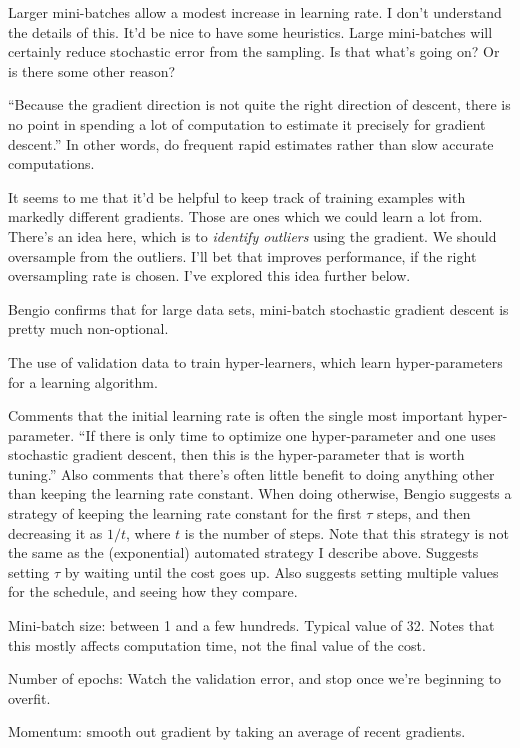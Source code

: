 \documentclass[12pt]{report}
\begin{document}
Larger mini-batches allow a modest increase in learning rate.  I don't
understand the details of this.  It'd be nice to have some heuristics.
Large mini-batches will certainly reduce stochastic error from the
sampling.  Is that what's going on?  Or is there some other reason?

``Because the gradient direction is not quite the right direction of
descent, there is no point in spending a lot of computation to
estimate it precisely for gradient descent.''  In other words, do
frequent rapid estimates rather than slow accurate computations.

It seems to me that it'd be helpful to keep track of training examples
with markedly different gradients.  Those are ones which we could
learn a lot from.  There's an idea here, which is to \emph{identify
  outliers} using the gradient.  We should oversample from the
outliers.  I'll bet that improves performance, if the right
oversampling rate is chosen.  I've explored this idea further below.

Bengio confirms that for large data sets, mini-batch stochastic
gradient descent is pretty much non-optional.

The use of validation data to train hyper-learners, which learn
hyper-parameters for a learning algorithm.

Comments that the initial learning rate is often the single most
important hyper-parameter.  ``If there is only time to optimize one
hyper-parameter and one uses stochastic gradient descent, then this is
the hyper-parameter that is worth tuning.''  Also comments that
there's often little benefit to doing anything other than keeping the
learning rate constant.  When doing otherwise, Bengio suggests a
strategy of keeping the learning rate constant for the first $\tau$
steps, and then decreasing it as $1/ t$, where $t$ is the number of
steps.  Note that this strategy is not the same as the (exponential)
automated strategy I describe above.  Suggests setting $\tau$ by
waiting until the cost goes up.  Also suggests setting multiple values
for the schedule, and seeing how they compare.

Mini-batch size: between 1 and a few hundreds.  Typical value of 32.
Notes that this mostly affects computation time, not the final value
of the cost.

Number of epochs: Watch the validation error, and stop once we're
beginning to overfit.

Momentum: smooth out gradient by taking an average of recent
gradients.
\end{document}
